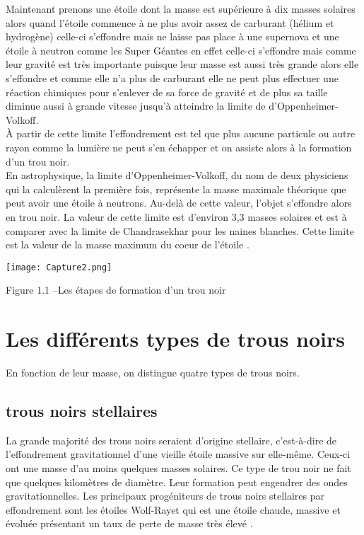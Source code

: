 \documentclass[12pt,  a4paper, openright]{report} %
\begin{document}
	Maintenant prenons une étoile dont la masse est supérieure à dix masses solaires alors quand l’étoile commence à ne plus avoir assez de carburant (hélium et hydrogène) celle-ci s’effondre mais ne laisse pas place à une supernova et une étoile à neutron comme les Super Géantes en effet celle-ci s’effondre mais comme leur gravité est très importante puisque leur masse est aussi très grande alors elle s’effondre et comme elle n’a plus de carburant elle ne peut plus effectuer une réaction chimiques pour s’enlever de sa force de gravité et de plus sa taille diminue aussi à grande vitesse jusqu’à atteindre la limite de d’Oppenheimer- Volkoff.\\
	À partir de cette limite l’effondrement est tel que plus aucune particule ou autre rayon comme la lumière ne peut s’en échapper et on assiste alors à la formation d’un trou noir.\\
	En astrophysique, la limite d'Oppenheimer-Volkoff, du nom de deux physiciens qui la calculèrent la première fois, représente la masse maximale théorique que peut avoir une étoile à neutrons. Au-delà de cette valeur, l'objet s'effondre alors en trou noir. La valeur de cette limite est d'environ 3,3 masses solaires et est à comparer avec la limite de Chandrasekhar pour les naines blanches. Cette limite est la valeur de la masse maximum du coeur de l'étoile \cite{3}.
	\begin{center}
		\texttt{[image: Capture2.png]}
		
	\end{center}
	Figure 1.1 –Les étapes de formation d’un trou noir
	\section{Les différents types de trous noirs}
	En fonction de leur masse, on distingue quatre types de trous noirs.
	\subsection{ trous noirs stellaires }
	La grande majorité des trous noirs seraient d’origine stellaire, c'est-à-dire de l’effondrement gravitationnel d’une vieille étoile massive sur elle-même. Ceux-ci ont une masse d'au moins quelques masses solaires. Ce type de trou noir ne fait que quelques kilomètres de diamètre. Leur formation peut engendrer des ondes gravitationnelles.
	Les principaux progéniteurs de trous noirs stellaires par effondrement sont les étoiles Wolf-Rayet qui est une étoile chaude, massive et évoluée présentant un taux de perte de masse très élevé . 
\end{document}
